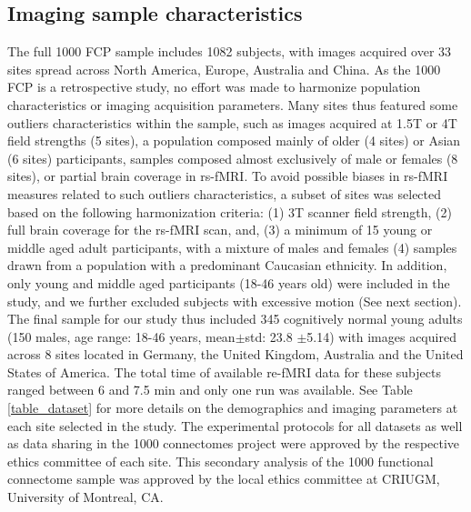 \documentclass[authoryear]{elsarticle}
\begin{document}
\subsection{Imaging sample characteristics}
The full 1000 FCP sample includes 1082 subjects, with images acquired over 33 sites spread across North America, Europe, Australia and China. As the 1000 FCP is a retrospective study, no effort was made to harmonize population characteristics or imaging acquisition parameters. Many sites thus featured some outliers characteristics within the sample, such as images acquired at 1.5T or 4T field strengths (5 sites), a population composed mainly of older (4 sites) or Asian (6 sites) participants, samples composed almost exclusively of male or females (8 sites), or partial brain coverage in rs-fMRI. To avoid possible biases in rs-fMRI measures related to such outliers characteristics, a subset of sites was selected based on the following harmonization criteria: (1) 3T scanner field strength, (2) full brain coverage for the rs-fMRI scan, and, (3) a minimum of 15 young or middle aged adult participants, with a mixture of males and females (4) samples drawn from a population with a predominant Caucasian ethnicity. In addition, only young and middle aged participants (18-46 years old) were included in the study, and we further excluded subjects with excessive motion (See next section). The final sample for our study thus included 345 cognitively normal young adults (150 males, age range: 18-46 years, mean$\pm$std: 23.8 $\pm$5.14) with images acquired across 8 sites located in Germany, the United Kingdom, Australia and the United States of America. The total time of available re-fMRI data for these subjects ranged between 6 and 7.5 min and only one run was available. See Table \ref{table_dataset} for more details on the demographics and imaging parameters at each site selected in the study. The experimental protocols for all datasets as well as data sharing in the 1000 connectomes project were approved by the respective ethics committee of each site. This secondary analysis of the 1000 functional connectome sample was approved by the local ethics committee at CRIUGM, University of Montreal, CA.

 
\end{document}
